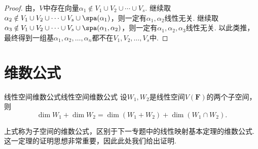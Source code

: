 \begin{proof}
    由，$V$中存在向量$\alpha_1\notin V_1\cup V_2\cup\cdots\cup V_s$. 继续取$\alpha_2\notin V_1\cup V_2\cup\cdots\cup V_s\cup\spa(\alpha_1)$，则一定有$\alpha_1,\alpha_2$线性无关. 继续取$\alpha_3\notin V_1\cup V_2\cup\cdots\cup V_s\cup\spa(\alpha_1,\alpha_2)$，则一定有$\alpha_1,\alpha_2,\alpha_3$线性无关. 以此类推，最终得到一组基$\alpha_1,\alpha_2,\ldots,\alpha_n$都不在$V_1,V_2,\ldots,V_s$中.
\end{proof}

\section{维数公式}

\begin{theorem}{线性空间维数公式}{线性空间维数公式}
    设$W_1,W_2$是线性空间$V(\mathbf{F})$的两个子空间，则
    \[\dim W_1+\dim W_2=\dim(W_1+W_2)+\dim(W_1\cap W_2).\]
\end{theorem}
上式称为子空间的维数公式，区别于下一专题中的线性映射基本定理的维数公式. 这一定理的证明思想非常重要，因此此处我们给出证明.

